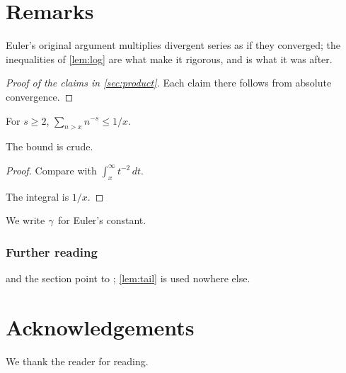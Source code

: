 \section{Remarks}\label{sec:remarks}

\begin{rem}
Euler's original argument multiplies divergent series as if they
converged; the inequalities of \cref{lem:log} are what make it rigorous,
and  is what it was after.
\end{rem}

\begin{proof}[Proof of the claims in \cref{sec:product}]
Each claim there follows from absolute convergence.
\end{proof}

\begin{lem}\label{lem:tail}
For $s \ge 2$, $\sum_{n > x} n^{-s} \le 1/x$.
\end{lem}
The bound is crude.
\begin{proof}
Compare with $\int_x^\infty t^{-2}\,dt$.

The integral is $1/x$.
\end{proof}

\ifdefined\eulerconst We write $\gamma$ for Euler's constant.\fi

\subsubsection*{Further reading}
 and the section  point to
\citet{primer2001}; \vref{lem:tail} is used nowhere else.

\section*{Acknowledgements}
We thank the reader for reading.
